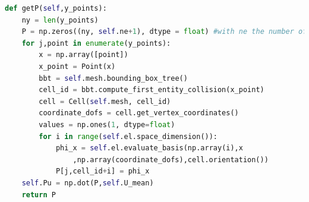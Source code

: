 \documentclass[%
  a4paper,oneside,%
  11pt,%
  smallchapters,
  green,%
  rgb, <cmyk>
  ,]{tubsbook}
\begin{document}
\begin{lstlisting}[language=Python]
def getP(self,y_points):
	ny = len(y_points)
	P = np.zeros((ny, self.ne+1), dtype = float) #with ne the number of elements
	for j,point in enumerate(y_points):
		x = np.array([point])
		x_point = Point(x)
		bbt = self.mesh.bounding_box_tree()
		cell_id = bbt.compute_first_entity_collision(x_point)
		cell = Cell(self.mesh, cell_id)
		coordinate_dofs = cell.get_vertex_coordinates()
		values = np.ones(1, dtype=float)
		for i in range(self.el.space_dimension()): 
			phi_x = self.el.evaluate_basis(np.array(i),x 
				,np.array(coordinate_dofs),cell.orientation())
			P[j,cell_id+i] = phi_x
	self.Pu = np.dot(P,self.U_mean)
	return P
\end{lstlisting}
\label{lst:getP}
\end{document}
